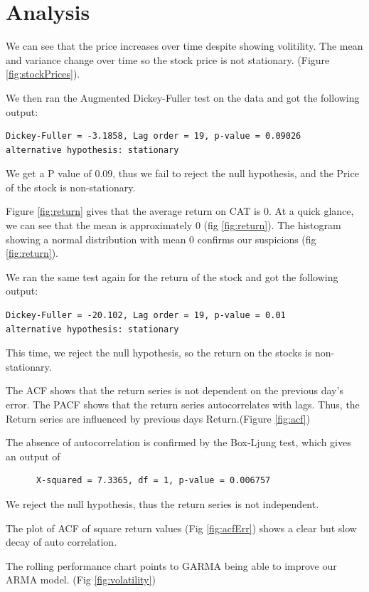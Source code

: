 \documentclass{article}
\begin{document}
\section{Analysis}
We can see that the price increases over time despite showing volitility. The mean and variance change over time so the stock price is not stationary. (Figure \ref{fig:stockPrices}).

\noindent We then ran the Augmented Dickey-Fuller test on the data and got the following output:
\begin{verbatim}
Dickey-Fuller = -3.1858, Lag order = 19, p-value = 0.09026
alternative hypothesis: stationary
\end{verbatim}
We get a P value of $0.09$, thus we fail to reject the null hypothesis, and the Price of the stock is non-stationary.


\noindent Figure \ref{fig:return} gives that the average return on CAT is $0$. At a quick glance, we can see that the mean is approximately 0 (fig \ref{fig:return}). The histogram showing a normal distribution with mean 0 confirms our suspicions (fig \ref{fig:return}).

\noindent We ran the same test again for the return of the stock and got the following output:
\begin{verbatim}
Dickey-Fuller = -20.102, Lag order = 19, p-value = 0.01
alternative hypothesis: stationary
\end{verbatim}
This time, we reject the null hypothesis, so the return on the stocks is non-stationary.

\noindent The ACF shows that the return series is not dependent on the previous day's error.
          The PACF shows that the return series autocorrelates with lags.
	  Thus, the Return series are influenced by previous days Return.(Figure \ref{fig:acf})

	  \noindent The absence of autocorrelation is confirmed by the Box-Ljung test, which gives an output of 
	  \begin{verbatim}
	  X-squared = 7.3365, df = 1, p-value = 0.006757
	  \end{verbatim}
We reject the null hypothesis,  thus the return series is not independent.

\noindent The plot of ACF of square return values (Fig \ref{fig:acfErr}) shows a clear but slow decay of auto correlation.

\noindent The rolling performance chart points to GARMA being able to improve our ARMA model. (Fig \ref{fig:volatility})
\end{document}

